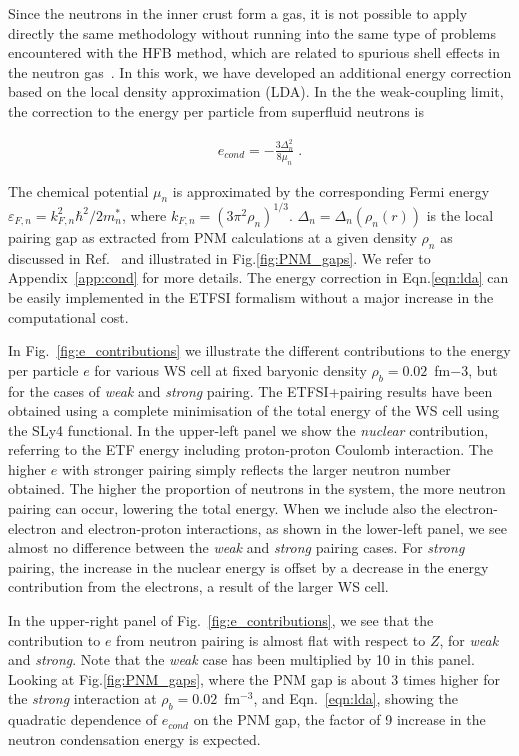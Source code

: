 \documentclass[
    amsmath,amssymb,
    aps,
    prc,
    floatfix,
]{revtex4-2}
\begin{document}
Since the neutrons in the inner crust form a gas, it is not possible to apply directly the same methodology without running into the same type of problems encountered with the HFB method, which are related to spurious shell effects in the neutron gas~\cite{Margueron2007b}.
In this work, we have developed an additional energy correction based on the local density approximation (LDA). In the the weak-coupling limit, the correction to the energy per particle from superfluid neutrons is~\cite{PhysRevLett793347}

    \begin{eqnarray}\label{eqn:lda}
        e_{cond}=-\frac{3\Delta_n^2}{8\mu_n}\;.
    \end{eqnarray}

\noindent The chemical potential $\mu_n$ is approximated by the corresponding Fermi energy $\varepsilon_{F,n}=k_{F,n}^2\hbar^2/2m^*_n$, where $k_{F,n}=\left(3\pi^2\rho_n\right)^{1/3}$. $\Delta_n=\Delta_n(\rho_n(r))$ is the local pairing gap as extracted from PNM calculations at a given density $\rho_n$ as discussed in Ref.~\cite{pastore2008microscopic} and illustrated in Fig.\ref{fig:PNM_gaps}.
We refer to Appendix~\ref{app:cond} for more details. The energy correction in Eqn.\ref{eqn:lda} can be easily implemented in the ETFSI formalism without a major increase in the computational cost.

In Fig.~\ref{fig:e_contributions} we illustrate the different contributions to the energy per particle $e$ for various WS cell at fixed baryonic density $\rho_b=0.02$~fm${-3}$, but for the cases of \emph{weak} and \emph{strong} pairing. The ETFSI+pairing results have been obtained using a complete minimisation of the total energy of the WS cell using the SLy4 functional.
In the upper-left panel we show the \emph{nuclear} contribution, referring to the ETF energy including proton-proton Coulomb interaction. The higher $e$ with stronger pairing simply reflects the larger neutron number obtained. The higher the proportion of neutrons in the system, the more neutron pairing can occur, lowering the total energy. When we include also the electron-electron and electron-proton interactions, as shown in the lower-left panel, we see almost no difference between the \emph{weak} and \emph{strong} pairing cases. For \emph{strong} pairing, the increase in the nuclear energy is offset by a decrease in the energy contribution from the electrons, a result of the larger WS cell.

In the upper-right panel of Fig.~\ref{fig:e_contributions}, we see that the contribution to $e$ from neutron pairing is almost flat with respect to $Z$, for \emph{weak} and \emph{strong}. Note that the \emph{weak} case has been multiplied by 10 in this panel. Looking at Fig.\ref{fig:PNM_gaps}, where the PNM gap is about 3 times higher for the \emph{strong} interaction at $\rho_b=0.02$~fm$^{-3}$, and Eqn.~\ref{eqn:lda}, showing the quadratic dependence of $e_{cond}$ on the PNM gap, the factor of 9 increase in the neutron condensation energy is expected.
\end{document}
